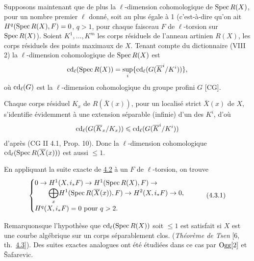 \documentclass[10pt]{../fichiers-configuration-latex/smfart}
\begin{document}
\setcounter{subsection}{2}
\subsection{}
Supposons maintenant que de plus la $\ell$-dimension cohomologique de
$\operatorname{Spec} R(X)$, pour un nombre premier $\ell$ donné, soit au plus égale
à 1 (c'est-à-dire qu'on ait $H^q(\operatorname{Spec} R(X), F)=0$, $q>1$, pour chaque
faisceau $F$ de $\ell$-torsion sur $\operatorname{Spec} R(X)$). Soient
$K^1,\ldots,K^m$ les corps résiduels de l'anneau artinien $R(X)$, \ie
les corps résiduels des points maximaux de $X$. Tenant compte du
dictionnaire (VIII 2) la $\ell$-dimension cohomologique de $\operatorname{Spec}
R(X)$ est
$$
\operatorname{cd}_{\ell}(\operatorname{Spec} R(X))=\mathop{\sup}_i \{\operatorname{cd}_{\ell}
(G(\overline{K}^{i}/K^{i}))\}{},
$$
où $\operatorname{cd}_{\ell}(G)$ est la $\ell$-dimension cohomologique du groupe
profini $G$ [\cf CG].

Chaque corps résiduel $K_x$ de $R(\bar{X}(x))$, pour un localisé
strict $\bar{X}(x)$ de $X$, s'identifie évidemment à une extension
séparable (infinie) d'un des $K^i$, d'où
$$
\operatorname{cd}_{\ell}(G(\overline{K}_x/K_x))\leqslant \operatorname{cd}_{\ell} (G(\overline{K}^i/K^i))
$$
d'après (CG II 4.1, Prop. 10). Donc la $\ell$-dimension cohomologique
$\operatorname{cd}_{\ell}(\operatorname{Spec} R(\overline{X}(x)))$ est aussi $\leq 1$.

En appliquant la suite exacte de \hyperref[IX.cor4.2]{4.2} à un $F$ de $\ell$-torsion, on
trouve
\begin{equation*}
\begin{cases}
 0\rightarrow H^1(X,i_{\ast}F)\rightarrow H^1(\operatorname{Spec}
R(X), F)\rightarrow\\
\qquad \displaystyle{\bigoplus_x} H^1(\operatorname{Spec} R(\overline{X}(x)),F)\rightarrow
H^2(X,i_{\ast}F)\rightarrow 0{},\\
 H^q(X,i_{\ast}F)=0\mbox{ pour } q> 2{}.
\end{cases}\tag{4.3.1}
\end{equation*}

Remarquons\pageoriginale que l'hypothèse que $\operatorname{cd}_{\ell}(\operatorname{Spec} R(X))$
soit $\leq 1$
est satisfait si $X$ est une courbe algébrique sur un corps
séparablement clos. (\emph{Théorème de Tsen} [6, th.~\hyperref[IX.subsec4.3]{4.3}]). Des suites
exactes analogues ont été étudiées dans ce cas par $\operatorname{Ogg}[2]$ et
\v{S}afarevic.
\end{document}
